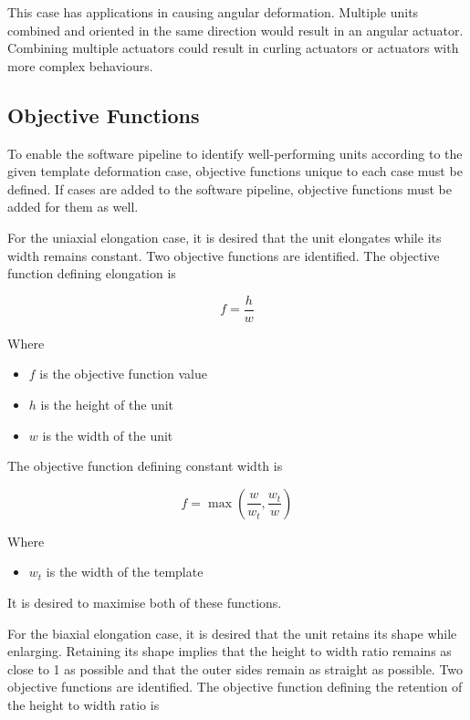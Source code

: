 This case has applications in causing angular deformation. Multiple units combined and oriented in the same direction would result in an angular actuator. Combining multiple actuators could result in curling actuators or actuators with more complex behaviours.

\subsection{Objective Functions}

To enable the software pipeline to identify well-performing units according to the given template deformation case, objective functions unique to each case must be defined. If cases are added to the software pipeline, objective functions must be added for them as well.

For the uniaxial elongation case, it is desired that the unit elongates while its width remains constant. Two objective functions are identified. The objective function defining elongation is

\begin{equation}
	f=\frac{h}{w}
\end{equation}

Where

\begin{itemize}
	\item $f$ is the objective function value
	\item $h$ is the height of the unit
	\item $w$ is the width of the unit
\end{itemize}

The objective function defining constant width is

\begin{equation}
	f=\max\left (\frac{w}{w_{t}},\frac{w_{t}}{w} \right )
\end{equation}

Where

\begin{itemize}
	\item $w_{t}$ is the width of the template
\end{itemize}

It is desired to maximise both of these functions.

For the biaxial elongation case, it is desired that the unit retains its shape while enlarging. Retaining its shape implies that the height to width ratio remains as close to 1 as possible and that the outer sides remain as straight as possible. Two objective functions are identified. The objective function defining the retention of the height to width ratio is

